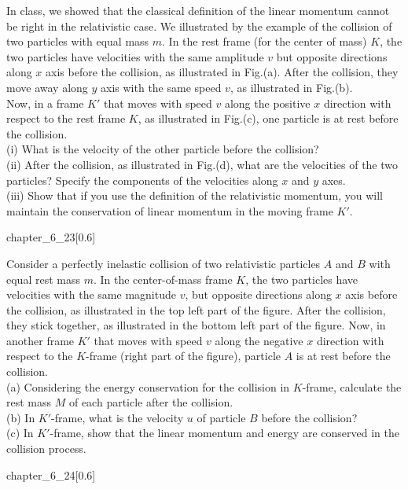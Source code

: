 \begin{example}
    In class, we showed that the classical definition of the linear
    momentum cannot be right in the relativistic case. We illustrated by the
    example of the collision of two particles with equal mass $m$. In the rest
    frame (for the center of mass) $K$, the two particles have velocities with
    the same amplitude $v$ but opposite directions along $x$ axis before the
    collision, as illustrated in Fig.(a). After the collision, they move away along $y$ axis with the same speed $v$, as illustrated in Fig.(b). \\Now, in a frame $K'$ that moves with speed $v$ along the positive $x$ direction with respect to the rest frame $K$, as illustrated in Fig.(c), one particle is at rest before the
    collision. 
    \\(i) What is the velocity of the other particle before the
    collision? 
    \\(ii) After the collision, as illustrated in Fig.(d), what are the velocities of
    the two particles? Specify the components of the velocities along $x$ and
    $y$ axes.
    \\(iii) Show that if you use the definition of the relativistic
    momentum, you will maintain the conservation of linear momentum in
    the moving frame $K'$.
	\begin{singlefigure}{chapter_6_23}[0.6]   
	\end{singlefigure}
\end{example}
\begin{example}
    Consider a perfectly inelastic collision of two relativistic particles $A$ and $B$ with equal rest mass $m$. In the center-of-mass frame $K$, the two particles have velocities with the same magnitude $v$, but opposite directions along $x$ axis before the collision, as illustrated in the top left part of the figure. After the collision, they stick together, as illustrated in the bottom left part of the figure. Now, in another frame $K'$ that moves with speed $v$ along the negative $x$ direction with respect to the $K$-frame (right part of the figure), particle $A$ is at rest before the collision.
    \\(a) Considering the energy conservation for the collision in $K$-frame, calculate the
    rest mass $M$ of each particle after the collision.
    \\(b) In $K'$-frame, what is the velocity $u$ of particle $B$ before the collision?
    \\(c) In $K'$-frame, show that the linear momentum and energy are conserved in the collision process.
    \begin{singlefigure}{chapter_6_24}[0.6]    
    \end{singlefigure}
\end{example}
